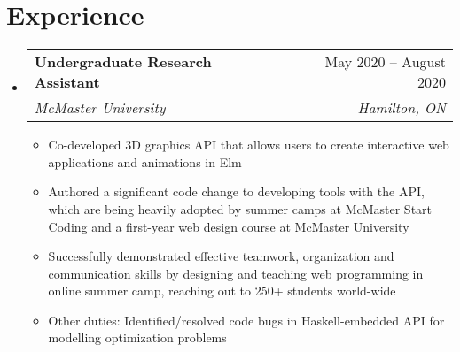 \documentclass[letterpaper,11pt]{article}
\makeatletter
\newcommand{\resumeItem}[1]{
  \item\small{
    {#1 \vspace{-2pt}}
  }
}
\newcommand{\resumeSubheading}[4]{
  \vspace{-2pt}\item
    \begin{tabular*}{0.97\textwidth}[t]{l@{\extracolsep{\fill}}r}
      \textbf{#1} & #2 \\
      \textit{\small#3} & \textit{\small #4} \\
    \end{tabular*}\vspace{-7pt}
}
\newcommand{\resumeSubSubheading}[2]{
    \item
    \begin{tabular*}{0.97\textwidth}{l@{\extracolsep{\fill}}r}
      \textit{\small#1} & \textit{\small #2} \\
    \end{tabular*}\vspace{-7pt}
}
\newcommand{\resumeSubHeadingListStart}{\begin{itemize}[leftmargin=0.15in, label={}]}
\newcommand{\resumeSubHeadingListEnd}{\end{itemize}}
\newcommand{\resumeItemListStart}{\begin{itemize}}
\newcommand{\resumeItemListEnd}{\end{itemize}\vspace{-5pt}}
\makeatother
\begin{document}
\section{Experience}
  \resumeSubHeadingListStart


    \resumeSubheading
      {Undergraduate Research Assistant}{May 2020 -- August 2020}
      {McMaster University}{Hamilton, ON}
      \resumeItemListStart
        \resumeItem{Co-developed 3D graphics API that allows users to create interactive web applications and animations in Elm}
        \resumeItem{Authored a significant code change to developing tools with the API, which are being heavily adopted by summer camps
        at McMaster Start Coding and a first-year web design course at McMaster University}
        \resumeItem{Successfully demonstrated effective teamwork, organization and communication skills by designing and 
        teaching web programming in online summer camp, reaching out to 250+ students world-wide}
        \resumeItem{Other duties: Identified/resolved code bugs in Haskell-embedded API for modelling optimization problems }



      \resumeItemListEnd
    \resumeSubHeadingListEnd
\end{document}
